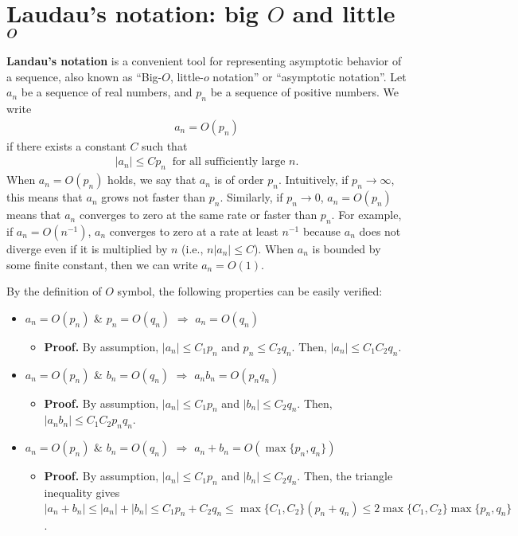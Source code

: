 \documentclass[11pt, A4paper, openany, uplatex]{book}
\begin{document}
\section{Laudau's notation: big $O$ and little $o$}

\textbf{Landau's notation} is a convenient tool for representing asymptotic behavior of a sequence, also known as ``Big-$O$, little-$o$ notation'' or ``asymptotic notation''.
Let $a_n$ be a sequence of real numbers, and $p_n$ be a sequence of positive numbers.
We write
\begin{align*}
	a_n = O(p_n)
\end{align*}
if there exists a constant $C$ such that 
\begin{align*}
	|a_n| \le C p_n \;\; \text{for all sufficiently large $n$.}
\end{align*}
When $a_n = O(p_n)$ holds, we say that $a_n$ is of order $p_n$. 
Intuitively, if $p_n \to \infty$, this means that $a_n$ grows not faster than $p_n$.
Similarly, if $p_n \to 0$, $a_n = O(p_n)$ means that $a_n$ converges to zero at the same rate or faster than $p_n$.
For example, if $a_n = O(n^{-1})$, $a_n$ converges to zero at a rate at least $n^{-1}$ because $a_n$ does not diverge even if it is multiplied by $n$ (i.e., $n |a_n| \le C$).
When $a_n$ is bounded by some finite constant, then we can write $a_n = O(1)$.

By the definition of $O$ symbol, the following properties can be easily verified:
\begin{lemma}\label{lem:bigo}
\begin{itemize}
	\item $a_n = O(p_n)$ \& $p_n = O(q_n)$ $\Longrightarrow$ $a_n = O(q_n)$
	\begin{itemize}
		\item \upshape \textbf{Proof.} By assumption, $|a_n| \le C_1 p_n$ and $p_n \le C_2 q_n$. Then, $|a_n| \le C_1 C_2 q_n$.
	\end{itemize}
	\item $a_n = O(p_n)$ \& $b_n = O(q_n)$ $\Longrightarrow$ $a_n b_n = O(p_n q_n)$
	\begin{itemize}
		\item \upshape \textbf{Proof.} By assumption, $|a_n| \le C_1 p_n$ and $|b_n| \le C_2 q_n$.
		Then, $|a_n b_n| \le C_1 C_2 p_n q_n$.
	\end{itemize}
	\item $a_n = O(p_n)$ \& $b_n = O(q_n)$ $\Longrightarrow$ $a_n + b_n = O(\max\{p_n, q_n\})$
	\begin{itemize}
		\item \upshape \textbf{Proof.} By assumption, $|a_n| \le C_1 p_n$ and $|b_n| \le C_2 q_n$.
		Then, the triangle inequality gives $|a_n + b_n| \le |a_n| + |b_n| \le C_1 p_n + C_2 q_n \le \max\{C_1, C_2\} (p_n + q_n) \le 2 \max\{C_1, C_2\} \max\{p_n, q_n\}$.
	\end{itemize}
\end{itemize}
\end{lemma}
\end{document}
